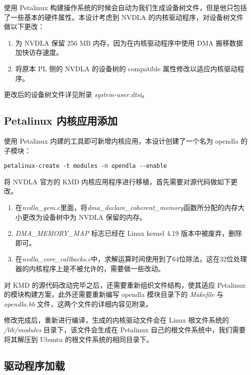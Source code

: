 使用 Petalinux 构建操作系统的时候会自动为我们生成设备树文件，但是他只包括了一些基本的硬件属性。本设计考虑到 NVDLA 的内核驱动程序，对设备树文件做以下更改：

\begin{enumerate}
    \item 为 NVDLA 保留 256 MB 内存，因为在内核驱动程序中使用 DMA 搬移数据加快访存速度。
    \item 将原本 PL 侧的 NVDLA 的设备树的 compatible 属性修改以适应内核驱动程序。
\end{enumerate}

更改后的设备树文件详见附录 \emph{system-user.dtsi}。

\subsection{Petalinux 内核应用添加}

使用 Petalinux 内建的工具即可新增内核应用，本设计创建了一个名为 opendla 的子模块：

\begin{lstlisting}
petalinux-create -t modules -n opendla --enable
\end{lstlisting}

将 NVDLA 官方的 KMD 内核应用程序进行移植，首先需要对源代码做如下更改。

\begin{enumerate}
    \item 在\emph{nvdla\_gem.c}里面，将\emph{dma\_declare\_coherent\_memory}函数所分配的内存大小更改为设备树中为 NVDLA 保留的内存。
    \item \emph{DMA\_MEMORY\_MAP } 标志已经在 Linux kernel 4.19 版本中被废弃，删除即可。
    \item 在\emph{nvdla\_core\_callbacks.c}中，求解运算时间使用到了64位除法，这在32位处理器的内核程序上是不被允许的，需要做一些改动。
\end{enumerate}

对 KMD 的源代码改动完毕之后，还需要重新组织文件结构，使其适应 Petalinux 的模块构建方案，此外还需要重新编写 opendla 模块目录下的 \emph{Makefile} 与 \emph{opendla.bb} 文件，这两个文件的详细内容见附录。

修改完成后，重新进行编译，生成的内核驱动文件会在 Linux 根文件系统的 \emph{/lib/modules} 目录下，该文件会生成在 Petalinux 自己的根文件系统中，我们需要将其解压到 Ubuntu 的根文件系统的相同目录下。

\subsection{驱动程序加载}

